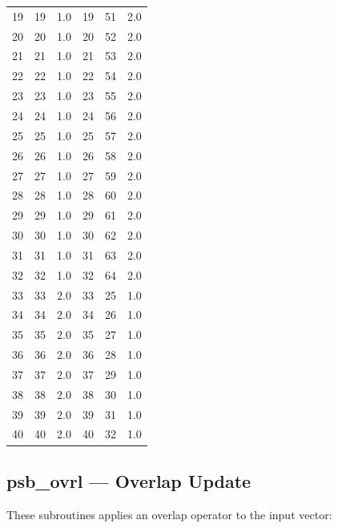 \begin{table}
\begin{center}
\begin{tabular}{rrr@{\hspace{6\tabcolsep}}rrr}
 19   &   19  &  1.0   &  19  &  51  &   2.0 \\
 20   &   20  &  1.0   &  20  &  52  &   2.0 \\ 
21   &   21  &  1.0   &  21  &  53  &   2.0 \\
22   &   22  &  1.0   &  22  &  54  &   2.0 \\
23   &   23  &  1.0   &  23  &  55  &   2.0 \\
24   &   24  &  1.0   &  24  &  56  &   2.0 \\
25   &   25  &  1.0   &  25  &  57  &   2.0 \\
26   &   26  &  1.0   &  26  &  58  &   2.0 \\
27   &   27  &  1.0   &  27  &  59  &   2.0 \\
28   &   28  &  1.0   &  28  &  60  &   2.0 \\
29   &   29  &  1.0   &  29  &  61  &   2.0 \\
30   &   30  &  1.0   &  30  &  62  &   2.0 \\
31   &   31  &  1.0   &  31  &  63  &   2.0 \\
32   &   32  &  1.0   &  32  &  64  &   2.0 \\
33   &   33  &  2.0   &  33  &  25  &   1.0 \\
34   &   34  &  2.0   &  34  &  26  &   1.0 \\
35   &   35  &  2.0   &  35  &  27  &   1.0 \\
36   &   36  &  2.0   &  36  &  28  &   1.0 \\
37   &   37  &  2.0   &  37  &  29  &   1.0 \\
38   &   38  &  2.0   &  38  &  30  &   1.0 \\
39   &   39  &  2.0   &  39  &  31  &   1.0 \\
40   &   40  &  2.0   &  40  &  32  &   1.0 \\
\end{tabular}
\end{center}
\end{table}

%
%


\clearpage\subsection{psb\_ovrl --- Overlap Update}

These subroutines applies an overlap operator to the input vector:

